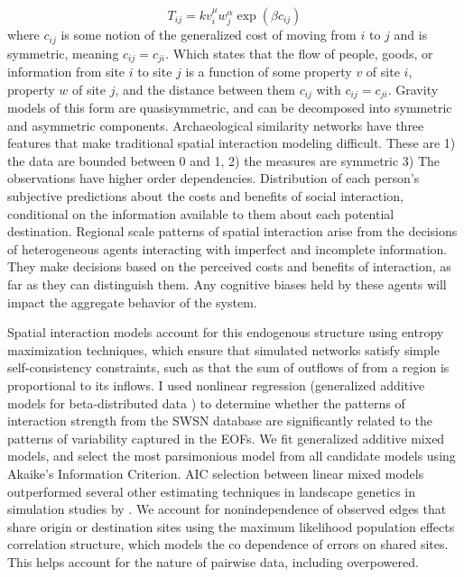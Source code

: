 \documentclass[11pt]{wlscirep}
\begin{document}
\begin{equation}
    T_{ij} = k v_i^\mu w_j^\alpha \exp(\beta c_{ij})
\end{equation}
where $c_{ij}$ is some notion of the generalized cost of moving from $i$ to $j$ and is symmetric, meaning $c_{ij} = c_{ji}$. Which states that the flow of people, goods, or information from site $i$ to site $j$ is a function of some property $v$ of site $i$, property $w$ of site $j$, and the distance between them $c_{ij}$ with $c_{ij} = c_{ji}$. Gravity models of this form are quasisymmetric, and can be decomposed into symmetric and asymmetric components. 
Archaeological similarity networks have three features that make traditional spatial interaction modeling difficult. These are 1) the data are bounded between 0 and 1, 2) the measures are symmetric
3) The observations have higher order dependencies. Distribution of each person's subjective predictions about the costs and benefits of social interaction, conditional on the information available to them about each potential destination. Regional scale patterns of spatial interaction arise from the decisions of heterogeneous agents interacting with imperfect and incomplete information. They make decisions based on the perceived costs and benefits of interaction, as far as they can distinguish them. Any cognitive biases held by these agents will impact the aggregate behavior of the system.

Spatial interaction models account for this endogenous structure using entropy maximization techniques, which ensure that simulated networks satisfy simple self-consistency constraints, such as that the sum of outflows of from a region is proportional to its inflows.
I used nonlinear regression (generalized additive models for beta-distributed data \cite{Wood2006a}) to determine whether the patterns of interaction strength from the SWSN database are significantly related to the patterns of variability captured in the EOFs.
We fit generalized additive mixed models, and select the most parsimonious model from all candidate models using Akaike's Information Criterion. AIC selection between linear mixed models outperformed several other estimating techniques in landscape genetics in simulation studies by \cite{Shirk et al 2018}. We account for nonindependence of observed edges that share origin or destination sites using the maximum likelihood population effects correlation structure, which models the co dependence of errors on shared sites. This helps account for the nature of pairwise data, including overpowered.
\end{document}
